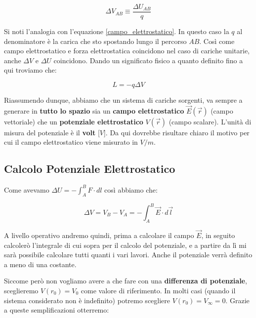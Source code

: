  \begin{large}
 \begin{equation}\label{potenziale_elettrostatico}
 	\Delta V_{AB} \equiv \frac{\Delta U_{AB}}{q}
 \end{equation}
\end{large}
 
 Si noti l'analogia con l'equazione \ref{campo_elettrostatico}. In questo caso la $q$ al denominatore è la carica che sto spostando lungo il percorso $AB$. Così come campo elettrostatico e forza elettrostatica coincidono nel caso di cariche unitarie, anche $\Delta V$ e $\Delta U$ coincidono.  Dando un significato fisico a quanto definito fino a qui troviamo che: 
 
 \begin{equation}\label{lavoro_campo_elettrostatico}
 	L = -q \Delta V
 \end{equation} 

Riassumendo dunque, abbiamo che un sistema di cariche sorgenti, va sempre a generare in \textbf{tutto lo spazio} sia un \textbf{campo elettrostatico} $\vec{E}(\vec{r})$ (campo vettoriale) che un \textbf{potenziale elettrostatico} $V(\vec{r})$ (campo scalare). L'unità di misura del potenziale è il \textbf{volt} [$V$]. Da qui dovrebbe risultare chiaro il motivo per cui il campo elettrostatico viene misurato in $V/m$.

\subsection{Calcolo Potenziale Elettrostatico}
Come avevamo $\Delta U = - \int_{A}^{B}{F \cdot dl}$ così abbiamo che: 
\begin{large}
\begin{equation}\label{eq_calcolo_potenziale}
	\Delta V = V_B - V_A = -\int_{A}^{B}\vec{E} \cdot d\vec{l}
\end{equation}
\end{large}

A livello operativo andremo quindi, prima a calcolare il campo $\vec{E}$, in seguito calcolerò l'integrale di cui sopra per il calcolo del potenziale, e a partire da lì mi sarà possibile calcolare tutti quanti i vari lavori. Anche il potenziale verrà definito a meno di una costante. 

Siccome però non vogliamo avere a che fare con una \textbf{differenza di potenziale}, sceglieremo $V(r_0) = V_0$ come valore di riferimento. In molti casi (quando il sistema considerato non è indefinito) potremo scegliere $V(r_0) = V_\infty = 0$. Grazie a queste semplificazioni otterremo: 

